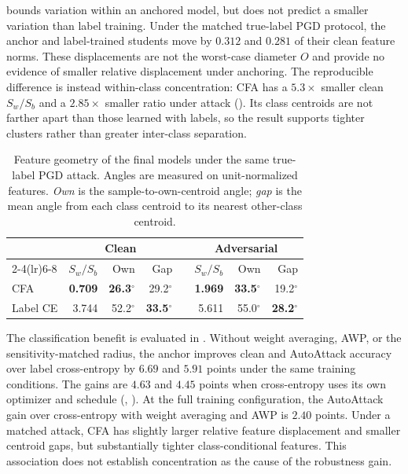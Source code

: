  bounds variation within an anchored model, but does not predict a smaller
variation than label training. Under the matched true-label PGD protocol, the anchor and
label-trained students move by $0.312$ and $0.281$ of their clean feature norms. These
displacements are not the worst-case diameter $O$ and provide no evidence of smaller relative
displacement under anchoring. The reproducible difference is instead within-class concentration:
CFA has a $5.3\times$ smaller clean $S_w/S_b$ and a $2.85\times$ smaller ratio under attack
(). Its class centroids are not farther apart than those learned with labels,
so the result supports tighter clusters rather than greater inter-class separation.

\begin{table}[!htbp]
  \centering \small \setlength{\tabcolsep}{4pt}
  \caption{Feature geometry of the final models under the same true-label PGD attack. Angles are
  measured on unit-normalized features. \emph{Own} is the
  sample-to-own-centroid angle; \emph{gap} is the mean angle from each class centroid to its
  nearest other-class centroid.}
  \label{tab:anchorgeometry}
  \begin{tabular}{lrrrcrrr}
    \toprule
    & \multicolumn{3}{c}{Clean} & & \multicolumn{3}{c}{Adversarial} \\
    \cmidrule(lr){2-4}\cmidrule(lr){6-8}
    & $S_w/S_b$ & Own & Gap & & $S_w/S_b$ & Own & Gap \\
    \midrule
    CFA & \textbf{0.709} & \textbf{26.3$^\circ$} & 29.2$^\circ$ && \textbf{1.969} & \textbf{33.5$^\circ$} & 19.2$^\circ$ \\
    Label CE & 3.744 & 52.2$^\circ$ & \textbf{33.5$^\circ$} && 5.611 & 55.0$^\circ$ & \textbf{28.2$^\circ$} \\
    \bottomrule
  \end{tabular}
\end{table}


The classification benefit is evaluated in . Without weight averaging, AWP,
or the sensitivity-matched radius, the anchor improves clean and AutoAttack accuracy over label
cross-entropy by $6.69$ and $5.91$ points under the same training conditions. The gains are $4.63$
and $4.45$ points when cross-entropy uses its own optimizer and schedule
(, ). At the full training configuration, the AutoAttack gain
over cross-entropy with weight averaging and AWP is $2.40$ points. Under a matched attack, CFA has
slightly larger relative feature displacement and smaller centroid gaps, but substantially tighter
class-conditional features. This association does not establish concentration as the cause of the
robustness gain.

